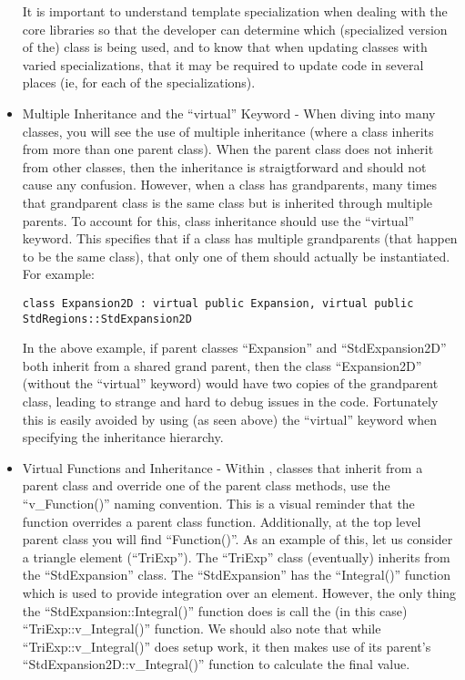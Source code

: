 \begin{itemize}
  It is important to understand template specialization when dealing
  with the {\nek} core libraries so that the developer can
  determine which (specialized version of the) class is being used,
  and to know that when updating classes with varied specializations,
  that it may be required to update code in several places (ie, for
  each of the specializations).

\item Multiple Inheritance and the ``virtual'' Keyword - When diving
  into many {\nek} classes, you will see the use of multiple
  inheritance (where a class inherits from more than one parent
  class).  When the parent class does not inherit from other classes,
  then the inheritance is straigtforward and should not cause any
  confusion.  However, when a class has grandparents, many times that
  grandparent class is the same class but is inherited through multiple
  parents.  To account for this, class inheritance should use the
  ``virtual'' keyword.  This specifies that if a class has multiple
  grandparents (that happen to be the same class), that only one of
  them should actually be instantiated.  For example: \\

\begin{verbatim}
class Expansion2D : virtual public Expansion, virtual public StdRegions::StdExpansion2D
\end{verbatim}

In the above example, if parent classes ``Expansion'' and
``StdExpansion2D'' both inherit from a shared grand parent, then the
class ``Expansion2D'' (without the ``virtual'' keyword) would have two
copies of the grandparent class, leading to strange and hard to debug
issues in the code.  Fortunately this is easily avoided by using (as
seen above) the ``virtual'' keyword when specifying the inheritance hierarchy.

\item Virtual Functions and Inheritance - Within {\nek}, classes
  that inherit from a parent class and override one of the parent
  class methods, use the ``v\_Function()'' naming convention.  This is a
  visual reminder that the function overrides a parent class function.
  Additionally, at the top level parent class you will find
  ``Function()''.  As an example of this, let us consider a triangle
  element (``TriExp'').  The ``TriExp'' class (eventually) inherits
  from the ``StdExpansion'' class.  The ``StdExpansion'' has the
  ``Integral()'' function which is used to provide integration over
  an element.  However, the only thing the
  ``StdExpansion::Integral()'' function does is call the (in this case)
  ``TriExp::v\_Integral()'' function.  We should also note that while
  ``TriExp::v\_Integral()'' does setup work, it then makes use of its parent's
  ``StdExpansion2D::v\_Integral()'' function to calculate the final value.


\end{itemize}
